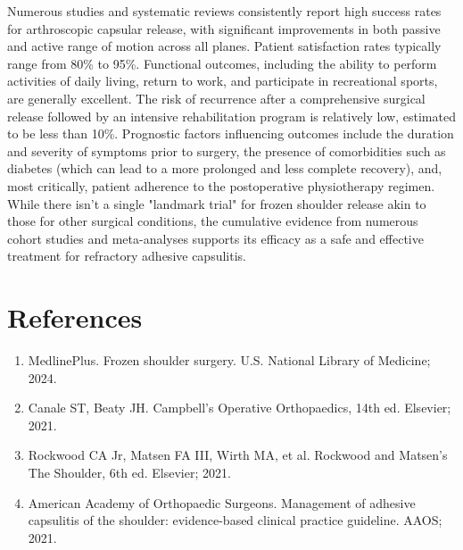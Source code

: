 Numerous studies and systematic reviews consistently report high success rates for arthroscopic capsular release, with significant improvements in both passive and active range of motion across all planes. Patient satisfaction rates typically range from 80\% to 95\%. Functional outcomes, including the ability to perform activities of daily living, return to work, and participate in recreational sports, are generally excellent. The risk of recurrence after a comprehensive surgical release followed by an intensive rehabilitation program is relatively low, estimated to be less than 10\%. Prognostic factors influencing outcomes include the duration and severity of symptoms prior to surgery, the presence of comorbidities such as diabetes (which can lead to a more prolonged and less complete recovery), and, most critically, patient adherence to the postoperative physiotherapy regimen. While there isn't a single "landmark trial" for frozen shoulder release akin to those for other surgical conditions, the cumulative evidence from numerous cohort studies and meta-analyses supports its efficacy as a safe and effective treatment for refractory adhesive capsulitis.

\section*{References}
\begin{enumerate}
  \item MedlinePlus. Frozen shoulder surgery. U.S. National Library of Medicine; 2024.
  
  \item Canale ST, Beaty JH. Campbell's Operative Orthopaedics, 14th ed. Elsevier; 2021.
  
  \item Rockwood CA Jr, Matsen FA III, Wirth MA, et al. Rockwood and Matsen's The Shoulder, 6th ed. Elsevier; 2021.
  
  \item American Academy of Orthopaedic Surgeons. Management of adhesive capsulitis of the shoulder: evidence-based clinical practice guideline. AAOS; 2021.
\end{enumerate}

\clearpage
